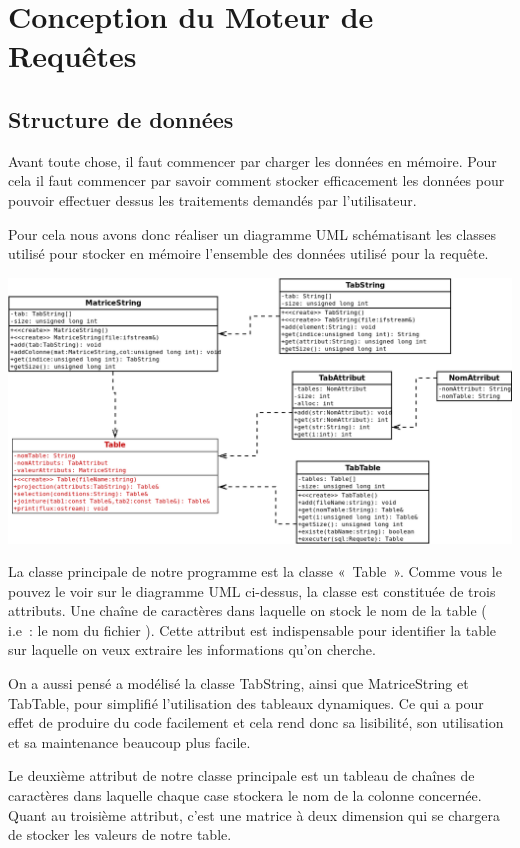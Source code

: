 \documentclass[oneside,13pt,a4paper]{report}
\begin{document}
    \chapter{Conception du Moteur de Requêtes}

        \section{Structure de données}
            Avant toute chose, il faut commencer par charger les données en mémoire. Pour cela il faut commencer par savoir comment stocker efficacement les données pour pouvoir effectuer dessus les traitements demandés par l’utilisateur.

            Pour cela nous avons donc réaliser un diagramme UML schématisant les classes utilisé pour stocker en mémoire l’ensemble des données utilisé pour la requête.

            \includegraphics[width=1\textwidth]{img/sql.png}\par

            La classe principale de notre programme est la classe « Table ». Comme vous le pouvez le voir sur le diagramme UML ci-dessus, la classe est constituée de trois attributs. Une chaîne de caractères dans laquelle on stock le nom de la table ( i.e : le nom du fichier ). Cette attribut est indispensable pour identifier la table sur laquelle on veux extraire les informations qu’on cherche.

            On a aussi pensé a modélisé la classe TabString, ainsi que MatriceString et TabTable, pour simplifié l’utilisation des tableaux dynamiques. Ce qui a pour effet de produire du code facilement et cela rend donc sa lisibilité, son utilisation et sa maintenance beaucoup plus facile.

            Le deuxième attribut de notre classe principale est un tableau de chaînes de caractères dans laquelle chaque case stockera le nom de la colonne concernée. Quant au troisième attribut, c’est une matrice à deux dimension qui se chargera de stocker les valeurs de notre table.
            
\end{document}
